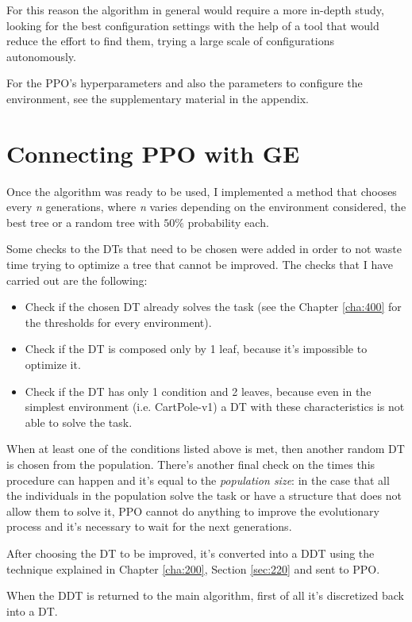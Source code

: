 For this reason the algorithm in general would require a more in-depth study, looking for the best configuration settings with the help of a tool that would reduce the effort to find them, trying a large scale of configurations autonomously.

For the PPO's hyperparameters and also the parameters to configure the environment, see the supplementary material in the appendix.

\section{Connecting PPO with GE}
\label{sec:330}
Once the algorithm was ready to be used, I implemented a method that chooses every \textit{n} generations, where \textit{n} varies depending on the environment considered, the best tree or a random tree with $50\%$ probability each.

Some checks to the DTs that need to be chosen were added in order to not waste time trying to optimize a tree that cannot be improved. The checks that I have carried out are the following:
\begin{itemize}
    \item Check if the chosen DT already solves the task (see the Chapter \ref{cha:400} for the thresholds for every environment).
    \item Check if the DT is composed only by 1 leaf, because it's impossible to optimize it.
    \item Check if the DT has only 1 condition and 2 leaves, because even in the simplest environment (i.e. CartPole-v1) a DT with these characteristics is not able to solve the task.
\end{itemize}

When at least one of the conditions listed above is met, then another random DT is chosen from the population. There's another final check on the times this procedure can happen and it's equal to the \textit{population size}: in the case that all the individuals in the population solve the task or have a structure that does not allow them to solve it, PPO cannot do anything to improve the evolutionary process and it's necessary to wait for the next generations.

After choosing the DT to be improved, it's converted into a DDT using the technique explained in Chapter \ref{cha:200}, Section \ref{sec:220} and sent to PPO.

When the DDT is returned to the main algorithm, first of all it's discretized back into a DT.

